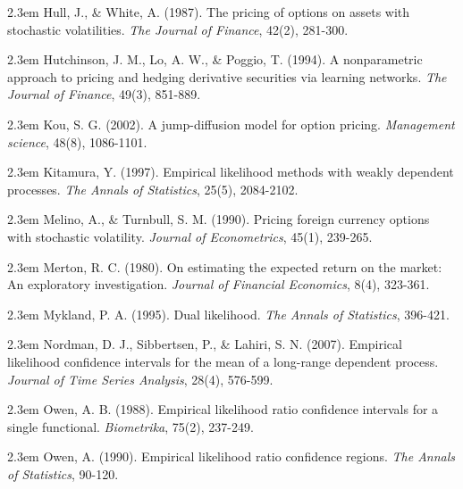 \documentclass[oneside,english]{amsbook}
\numberwithin{section}{chapter}
\numberwithin{equation}{section}
\numberwithin{figure}{section}
\theoremstyle{plain}
\theoremstyle{plain}
\theoremstyle{definition}
\theoremstyle{plain}
\theoremstyle{plain}
\theoremstyle{remark}
\theoremstyle{definition}
\theoremstyle{definition}
\begin{document}
\par\noindent\hangindent2.3em
Hull, J., \& White, A. (1987). The pricing of options on assets with stochastic volatilities. {\em The Journal of Finance}, 42(2), 281-300.

\par\noindent\hangindent2.3em
Hutchinson, J. M., Lo, A. W., \& Poggio, T. (1994). A nonparametric approach to pricing and hedging derivative securities via learning networks. {\em The Journal of Finance}, 49(3), 851-889.

\par\noindent\hangindent2.3em
Kou, S. G. (2002). A jump-diffusion model for option pricing. {\em Management science}, 48(8), 1086-1101.

\par\noindent\hangindent2.3em
Kitamura, Y. (1997). Empirical likelihood methods with weakly dependent processes. {\em The Annals of Statistics}, 25(5), 2084-2102.

\par\noindent\hangindent2.3em
Melino, A., \& Turnbull, S. M. (1990). Pricing foreign currency options with stochastic volatility. {\em Journal of Econometrics}, 45(1), 239-265.


\par\noindent\hangindent2.3em
Merton, R. C. (1980). On estimating the expected return on the market: An exploratory investigation. {\em Journal of Financial Economics}, 8(4), 323-361.

\par\noindent\hangindent2.3em
Mykland, P. A. (1995). Dual likelihood. {\em The Annals of Statistics}, 396-421.

\par\noindent\hangindent2.3em
Nordman, D. J., Sibbertsen, P., \& Lahiri, S. N. (2007). Empirical likelihood confidence intervals for the mean of a long-range dependent process. {\em Journal of Time Series Analysis}, 28(4), 576-599.

\par\noindent\hangindent2.3em
Owen, A. B. (1988). Empirical likelihood ratio confidence intervals for a single functional. {\em Biometrika}, 75(2), 237-249.

\par\noindent\hangindent2.3em
Owen, A. (1990). Empirical likelihood ratio confidence regions. {\em The Annals of Statistics}, 90-120.
\end{document}
